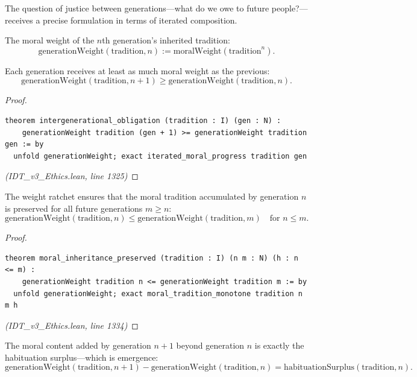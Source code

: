 The question of justice between generations---what do we owe to future
people?---receives a precise formulation in terms of iterated composition.

\begin{definition}
\label{def:generation-weight}
The moral weight of the $n$th generation's inherited tradition:
\[
  \mathrm{generationWeight}(\mathrm{tradition}, n) :=
  \mathrm{moralWeight}(\mathrm{tradition}^n).
\]
\end{definition}

\begin{theorem}
\label{thm:intergenerational}
Each generation receives at least as much moral weight as the previous:
\[
  \mathrm{generationWeight}(\mathrm{tradition}, n+1) \geq
  \mathrm{generationWeight}(\mathrm{tradition}, n).
\]
\end{theorem}

\begin{proof}
\begin{lstlisting}
theorem intergenerational_obligation (tradition : I) (gen : N) :
    generationWeight tradition (gen + 1) >= generationWeight tradition gen := by
  unfold generationWeight; exact iterated_moral_progress tradition gen
\end{lstlisting}
\textit{(IDT\_v3\_Ethics.lean, line 1325)}
\end{proof}

\begin{theorem}
\label{thm:inheritance-preserved}
The weight ratchet ensures that the moral tradition accumulated by
generation $n$ is preserved for all future generations $m \geq n$:
\[
  \mathrm{generationWeight}(\mathrm{tradition}, n) \leq
  \mathrm{generationWeight}(\mathrm{tradition}, m) \quad\text{for } n \leq m.
\]
\end{theorem}

\begin{proof}
\begin{lstlisting}
theorem moral_inheritance_preserved (tradition : I) (n m : N) (h : n <= m) :
    generationWeight tradition n <= generationWeight tradition m := by
  unfold generationWeight; exact moral_tradition_monotone tradition n m h
\end{lstlisting}
\textit{(IDT\_v3\_Ethics.lean, line 1334)}
\end{proof}

\begin{theorem}
\label{thm:generation-gap}
The moral content added by generation $n+1$ beyond generation $n$ is
exactly the habituation surplus---which is emergence:
\[
  \mathrm{generationWeight}(\mathrm{tradition}, n+1) -
  \mathrm{generationWeight}(\mathrm{tradition}, n) =
  \mathrm{habituationSurplus}(\mathrm{tradition}, n).
\]
\end{theorem}


